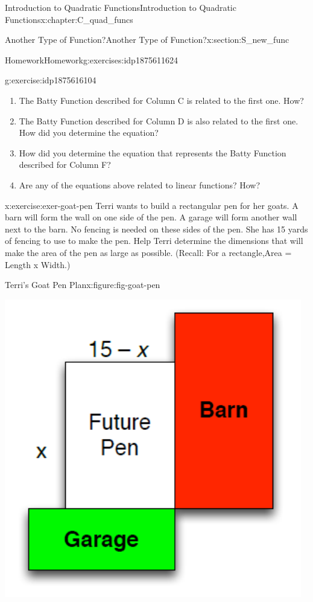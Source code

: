 \documentclass[oneside,10pt,]{book}
\numberwithin{equation}{chapter}
\begin{document}
\begin{chapterptx}{Introduction to Quadratic Functions}{}{Introduction to Quadratic Functions}{}{}{x:chapter:C_quad_funcs}
\begin{sectionptx}{Another Type of Function?}{}{Another Type of Function?}{}{}{x:section:S_new_func}
\begin{exercises-subsection}{Homework}{}{Homework}{}{}{g:exercises:idp1875611624}
\begin{divisionexercise}{4}{}{}{g:exercise:idp1875616104}
\begin{enumerate}[font=\bfseries,label=(\alph*),ref=\alph*]
\item{}The Batty Function described for Column C is related to the first one. How?%
\item{}The Batty Function described for Column D is also related to the first one. How did you determine the equation?%
\item{}How did you determine the equation that represents the Batty Function described for Column F?%
\item{}Are any of the equations above related to linear functions? How?%
\end{enumerate}
\end{divisionexercise}%
\begin{divisionexercise}{5}{}{}{x:exercise:exer-goat-pen}%
Terri wants to build a rectangular pen for her goats. A barn will form the wall on one side of the pen. A garage will form another wall next to the barn. No fencing is needed on these sides of the pen. She has 15 yards of fencing to use to make the pen. Help Terri determine the dimensions that will make the area of the pen as large as possible. (Recall: For a rectangle,Area = Length x Width.)%
\begin{figureptx}{Terri's Goat Pen Plan}{x:figure:fig-goat-pen}{}%
\begin{image}{0.3}{0.4}{0.3}%
\includegraphics[width=\linewidth]{external/goat-pen.pdf}

\end{image}
\end{figureptx}
\end{divisionexercise}
\end{exercises-subsection}
\end{sectionptx}
\end{chapterptx}
\end{document}
